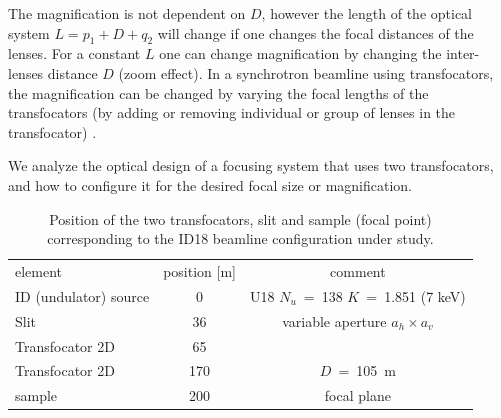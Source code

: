 \documentclass{iucr}              %
\begin{document}
The magnification is not dependent on $D$, however the length of the optical system $L=p_1+D+q_2$ will change if one changes the focal distances of the lenses. For a constant $L$ one can change magnification by changing the inter-lenses distance $D$ (zoom effect). In a synchrotron beamline using transfocators, the magnification can be changed by varying the focal lengths of the transfocators (by adding or removing individual or group of lenses in the transfocator) \cite{Vaughan:kv5084}.

We analyze the optical design of a focusing system that uses two transfocators, and how to configure it for the desired focal size or magnification. 


\begin{table}[]
    \label{table:id18parameters}
    \caption{Position of the two transfocators, slit and sample (focal point) corresponding to the ID18 beamline configuration under study. }
    \centering
    \begin{tabular}{l|c|c}
         element & position [m] & comment\\
         ID (undulator) source& 0 & U18 $N_u$~=~138 $K$~=~1.851 (7 keV)\\
         Slit & 36 &
         variable aperture $a_h\times a_v$
         \\
         Transfocator 2D & 65 & 
         \\
         Transfocator 2D & 170 & $D$~=~\SI{105}{\meter} \\
         sample & 200 & focal plane
    \end{tabular}


\end{table}
\end{document}
